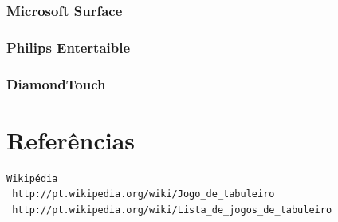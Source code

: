 \documentclass[a4paper,10pt]{article}
\begin{document}
\subsubsection{Microsoft Surface}
\subsubsection{Philips Entertaible}
\subsubsection{DiamondTouch}

\section{Referências}

\begin{verbatim}
Wikipédia
 http://pt.wikipedia.org/wiki/Jogo_de_tabuleiro
 http://pt.wikipedia.org/wiki/Lista_de_jogos_de_tabuleiro 
\end{verbatim}
\end{document}
